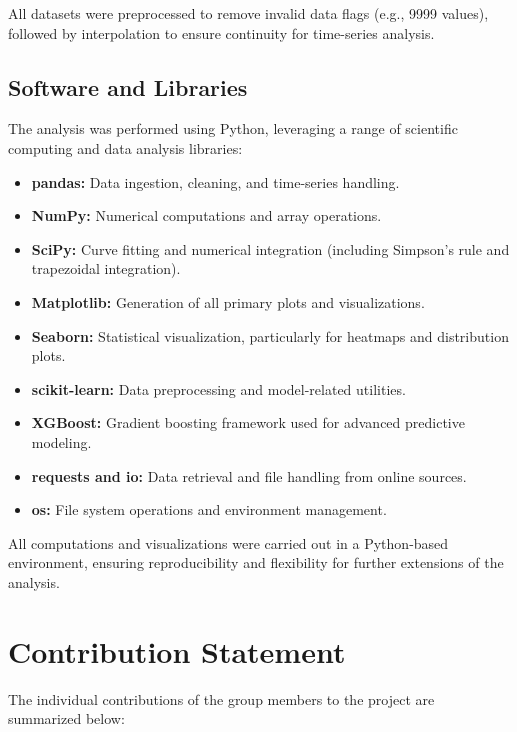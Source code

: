 \documentclass[12pt]{article}
\begin{document}
All datasets were preprocessed to remove invalid data flags (e.g., 9999 values), followed by interpolation to ensure continuity for time-series analysis.

\subsection{Software and Libraries}

The analysis was performed using Python, leveraging a range of scientific computing and data analysis libraries:

\begin{itemize}
    \item \textbf{pandas:} Data ingestion, cleaning, and time-series handling.
    \item \textbf{NumPy:} Numerical computations and array operations.
    \item \textbf{SciPy:} Curve fitting and numerical integration (including Simpson’s rule and trapezoidal integration).
    \item \textbf{Matplotlib:} Generation of all primary plots and visualizations.
    \item \textbf{Seaborn:} Statistical visualization, particularly for heatmaps and distribution plots.
    \item \textbf{scikit-learn:} Data preprocessing and model-related utilities.
    \item \textbf{XGBoost:} Gradient boosting framework used for advanced predictive modeling.
    \item \textbf{requests and io:} Data retrieval and file handling from online sources.
    \item \textbf{os:} File system operations and environment management.
\end{itemize}

All computations and visualizations were carried out in a Python-based environment, ensuring reproducibility and flexibility for further extensions of the analysis.


\section{Contribution Statement}
The individual contributions of the group members to the project are summarized below:
\end{document}
